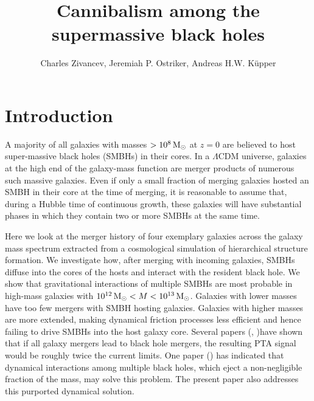 \documentclass[english, apj]{emulateapj}
\newcommand{\msun}{\mbox{$\,{\rm M}_\odot$}}
\begin{document}
\title{Cannibalism among the supermassive black holes}


\author{Charles Zivancev, Jeremiah P. Ostriker, Andreas H.W. K\"upper}




\begin{abstract}

\end{abstract}






\section{Introduction}\label{sec:introduction}
A majority of all galaxies with masses $>10^8\msun$ at $z=0$ are believed to host super-massive black holes (SMBHs) in their cores. In a $\Lambda$CDM universe, galaxies at the high end of the galaxy-mass function are merger products of numerous such massive galaxies. Even if only a small fraction of merging galaxies hosted an SMBH in their core at the time of merging, it is reasonable to assume that, during a Hubble time of continuous growth, these galaxies will have substantial phases in which they contain two or more SMBHs at the same time. 

Here we look at the merger history of four exemplary galaxies across the galaxy mass spectrum extracted from a cosmological simulation of hierarchical structure formation. We investigate how, after merging with incoming galaxies, SMBHs diffuse into the cores of the hosts and interact with the resident black hole. We show that gravitational interactions of multiple SMBHs are most probable in high-mass galaxies with $10^{12} \msun < M < 10^{13} \msun$. Galaxies with lower masses  have too few mergers with SMBH hosting galaxies. Galaxies with higher masses are more extended, making dynamical friction processes less efficient and hence failing to drive SMBHs into the host galaxy core.  Several papers (\citet{2018arXiv180403143I}, \citet{2014ApJ...789..156M})have shown that if all galaxy mergers lead to black hole mergers, the resulting PTA signal would be roughly twice the current limits.  One paper (\citet{2018MNRAS.473.3410R}) has indicated that dynamical interactions among multiple black holes, which eject a non-negligible fraction of the mass, may solve this problem.  The present paper also addresses this purported dynamical solution.
\end{document}

